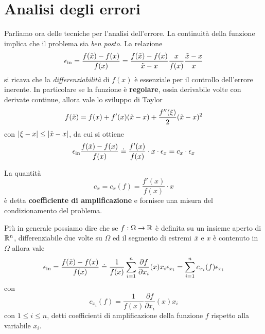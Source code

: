 \section{Analisi degli errori}
Parliamo ora delle tecniche per l'analisi dell'errore. La continuità della funzione implica che il problema sia
\emph{ben posto}. La relazione
\[
	\epsilon_\text{in} = \frac{f(\tilde{x}) - f(x)}{f(x)} =
	\frac{f(\tilde{x}) - f(x)}{\tilde{x} - x} \frac{x}{f(x)} \frac{\tilde{x} - x}{x}
\]
si ricava che la \emph{differenziabilità} di $f(x)$ è essenziale per il controllo dell'errore inerente. In
particolare se la funzione è \textbf{regolare}, ossia derivabile volte con derivate continue, allora vale
lo sviluppo di Taylor
\[ f(\tilde{x}) = f(x) + f'(x) (\tilde{x} - x) + \frac{f''(\xi)}{2} (\tilde{x} - x)^2 \]
con $|\xi - x| \leq |\tilde{x} - x|$, da cui si ottiene
\[
	\epsilon_\text{in} \frac{f(\tilde{x}) - f(x)}{f(x)} \doteq \frac{f'(x)}{f(x)} \cdot x \cdot \epsilon_x = c_x \cdot \epsilon_x
\]
\begin{definition}
	La quantità
	\[ c_x = c_x (f) = \frac{f'(x)}{f(x)} \cdot x \]
	è detta \textbf{coefficiente di amplificazione} e fornisce una misura del condizionamento del problema.
\end{definition}

Più in generale possiamo dire che se $f : \Omega \to \mathbb{R}$ è definita su un insieme aperto di $\mathbb{R}^n$, differenziabile
due volte su $\Omega$ ed il segmento di estremi $\tilde{x}$ e $x$ è contenuto in $\Omega$ allora vale
\[
	\epsilon_\text{in} = \frac{f(\tilde{x}) - f(x)}{f(x)} \doteq
	\frac{1}{f(x)} \sum_{i=1}^n \frac{\partial f}{\partial x_i} (x) x_i \epsilon_{x_i} =
	\sum_{i=1}^n c_{x_i} (f) \epsilon_{x_i}
\]
con
\[ c_{x_i} (f) = \frac{1}{f(x)} \frac{\partial f}{\partial x_i} (x) x_i \]
con $1 \leq i \leq n$, detti coefficienti di amplificazione della funzione $f$ rispetto alla variabile $x_i$.